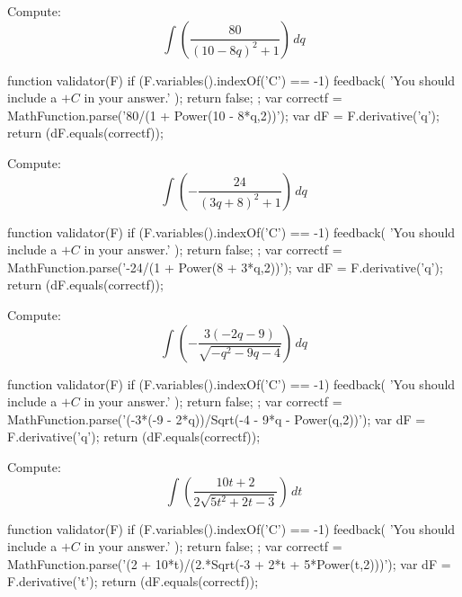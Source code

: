 \documentclass{ximera}
\renewcommand{\d}{\, d}
\begin{document}
\begin{exercise}
Compute: 
\[
\int \left(\frac{80}{(10-8 q)^2+1}\right)\d q
\]
\begin{expressionAnswer}
     function validator(F) {
      if (F.variables().indexOf('C') == -1) {
        feedback( 'You should include a $+C$ in your answer.' );
        return false;
      };      
      var correctf = MathFunction.parse('80/(1 + Power(10 - 8*q,2))');
      var dF = F.derivative('q');
      return (dF.equals(correctf));
    }
\end{expressionAnswer}
\end{exercise}



\begin{exercise}
Compute: 
\[
\int \left(-\frac{24}{(3 q+8)^2+1}\right)\d q
\]
\begin{expressionAnswer}
     function validator(F) {
      if (F.variables().indexOf('C') == -1) {
        feedback( 'You should include a $+C$ in your answer.' );
        return false;
      };      
      var correctf = MathFunction.parse('-24/(1 + Power(8 + 3*q,2))');
      var dF = F.derivative('q');
      return (dF.equals(correctf));
    }
\end{expressionAnswer}
\end{exercise}



\begin{exercise}
Compute: 
\[
\int \left(-\frac{3 (-2 q-9)}{\sqrt{-q^2-9 q-4}}\right)\d q
\]
\begin{expressionAnswer}
     function validator(F) {
      if (F.variables().indexOf('C') == -1) {
        feedback( 'You should include a $+C$ in your answer.' );
        return false;
      };      
      var correctf = MathFunction.parse('(-3*(-9 - 2*q))/Sqrt(-4 - 9*q - Power(q,2))');
      var dF = F.derivative('q');
      return (dF.equals(correctf));
    }
\end{expressionAnswer}
\end{exercise}



\begin{exercise}
Compute: 
\[
\int \left(\frac{10 t+2}{2 \sqrt{5 t^2+2 t-3}}\right)\d t
\]
\begin{expressionAnswer}
     function validator(F) {
      if (F.variables().indexOf('C') == -1) {
        feedback( 'You should include a $+C$ in your answer.' );
        return false;
      };      
      var correctf = MathFunction.parse('(2 + 10*t)/(2.*Sqrt(-3 + 2*t + 5*Power(t,2)))');
      var dF = F.derivative('t');
      return (dF.equals(correctf));
    }
\end{expressionAnswer}
\end{exercise}
\end{document}
